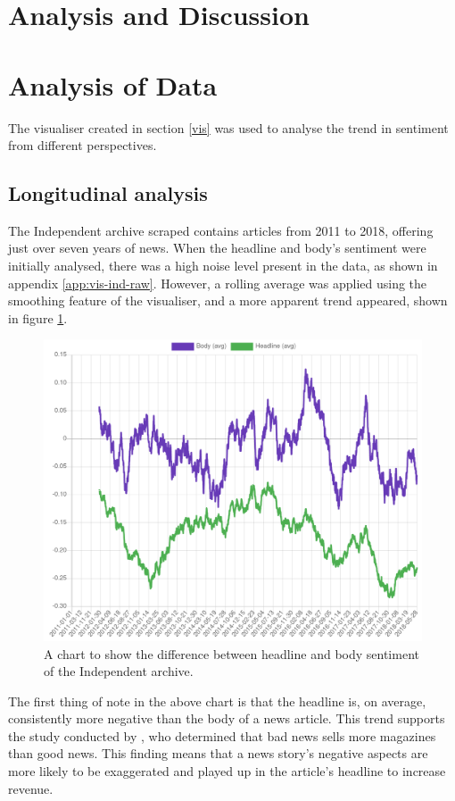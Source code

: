 \section{Analysis and Discussion}

\section{Analysis of Data}
The visualiser created in section \ref{vis} was used to analyse the trend in sentiment from different perspectives.

\subsection{Longitudinal analysis}
The Independent archive scraped contains articles from 2011 to 2018, offering just over seven years of news. When the headline and body's sentiment were initially analysed, there was a high noise level present in the data, as shown in appendix \ref{app:vis-ind-raw}. However, a rolling average was applied using the smoothing feature of the visualiser, and a more apparent trend appeared, shown in figure \ref{fig:smooth-ind}.

\begin{figure}[ht!]
  \includegraphics[width=\linewidth]{../visualisation/ind-smooth.png}
  \caption{A chart to show the difference between headline and body sentiment of the Independent archive.}
  \label{fig:smooth-ind}
\end{figure}

The first thing of note in the above chart is that the headline is, on average, consistently more negative than the body of a news article. This trend supports the study conducted by , who determined that bad news sells more magazines than good news. This finding means that a news story's negative aspects are more likely to be exaggerated and played up in the article's headline to increase revenue.


